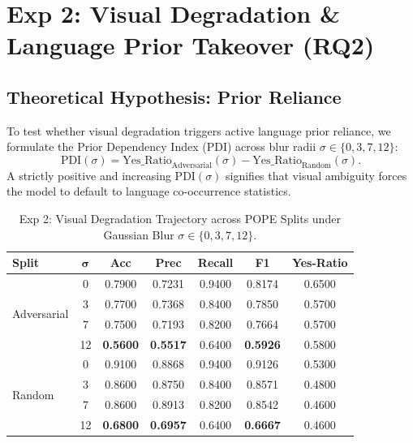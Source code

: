 \documentclass[conference]{IEEEtran}
\begin{document}
\section{Exp 2: Visual Degradation \& Language Prior Takeover (RQ2)}

\subsection{Theoretical Hypothesis: Prior Reliance}
To test whether visual degradation triggers active language prior reliance, we formulate the Prior Dependency Index (PDI) across blur radii $\sigma \in \{0, 3, 7, 12\}$:
\begin{equation}
\text{PDI}(\sigma) = \text{Yes\_Ratio}_{\text{Adversarial}}(\sigma) - \text{Yes\_Ratio}_{\text{Random}}(\sigma).
\end{equation}
A strictly positive and increasing $\text{PDI}(\sigma)$ signifies that visual ambiguity forces the model to default to language co-occurrence statistics.

\begin{table}[htbp]
\caption{Exp 2: Visual Degradation Trajectory across POPE Splits under Gaussian Blur $\sigma \in \{0, 3, 7, 12\}$.}
\label{tab:exp2_degradation}
\centering
\begin{tabular}{lcccccc}
\toprule
\textbf{Split} & $\mathbf{\sigma}$ & \textbf{Acc} & \textbf{Prec} & \textbf{Recall} & \textbf{F1} & \textbf{Yes-Ratio} \\
\midrule
\multirow{4}{*}{Adversarial} 
 & 0  & 0.7900 & 0.7231 & 0.9400 & 0.8174 & 0.6500 \\
 & 3  & 0.7700 & 0.7368 & 0.8400 & 0.7850 & 0.5700 \\
 & 7  & 0.7500 & 0.7193 & 0.8200 & 0.7664 & 0.5700 \\
 & 12 & \textbf{0.5600} & \textbf{0.5517} & 0.6400 & \textbf{0.5926} & 0.5800 \\
\midrule
\multirow{4}{*}{Random} 
 & 0  & 0.9100 & 0.8868 & 0.9400 & 0.9126 & 0.5300 \\
 & 3  & 0.8600 & 0.8750 & 0.8400 & 0.8571 & 0.4800 \\
 & 7  & 0.8600 & 0.8913 & 0.8200 & 0.8542 & 0.4600 \\
 & 12 & \textbf{0.6800} & \textbf{0.6957} & 0.6400 & \textbf{0.6667} & 0.4600 \\
\bottomrule
\end{tabular}
\end{table}
\end{document}

